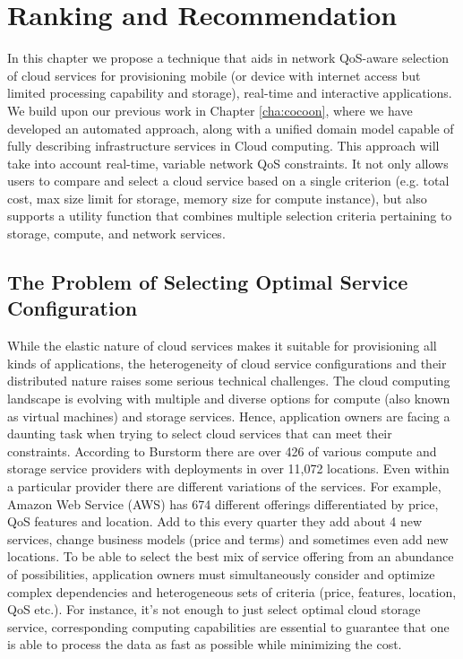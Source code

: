 \chapter{Ranking and Recommendation} 
\label{cha:AHP}
In this chapter we propose a technique that aids in network QoS-aware selection of cloud services for provisioning mobile (or device with internet access but limited processing capability and storage), real-time and interactive applications.
We build upon our previous work in Chapter \ref{cha:cocoon}, where we have developed an automated approach, along with a unified domain model capable of fully describing infrastructure services in Cloud computing. 
This approach will take into account real-time, variable network QoS constraints.
It not only allows users to compare and select a cloud service based on a single criterion (e.g. total cost, max size limit for storage, memory size for compute instance), but also supports 
a utility function that combines multiple selection criteria pertaining to storage, compute, and network services.

\section{The Problem of Selecting Optimal Service Configuration}
\label{sec:TheProblemOfSelectingOptimalServiceConfiguration}
While the elastic nature of cloud services makes it suitable for provisioning all kinds of applications, the heterogeneity of cloud service configurations and their distributed nature raises some serious technical challenges. 
The cloud computing landscape is evolving with multiple and diverse options for compute (also known as virtual machines) and storage services. Hence, application owners are facing a daunting task when trying to select cloud services that can meet their constraints. According to Burstorm \cite{Burstorm} there are over 426 of various compute and storage service providers with deployments in over 11,072 locations. Even within a particular provider there are different variations of the services. For example, Amazon Web Service (AWS) has 674 different offerings differentiated by price, QoS features and location. Add to this every quarter they add about 4 new services, change business models (price and terms) and sometimes even add new locations. To be able to select the best mix of service offering from an abundance of possibilities, application owners must simultaneously consider and optimize complex dependencies and heterogeneous sets of criteria (price, features, location, QoS etc.). For instance, it's not enough to just select optimal cloud storage service, corresponding computing capabilities are essential to guarantee that one is able to process the data as fast as possible while minimizing the cost.

